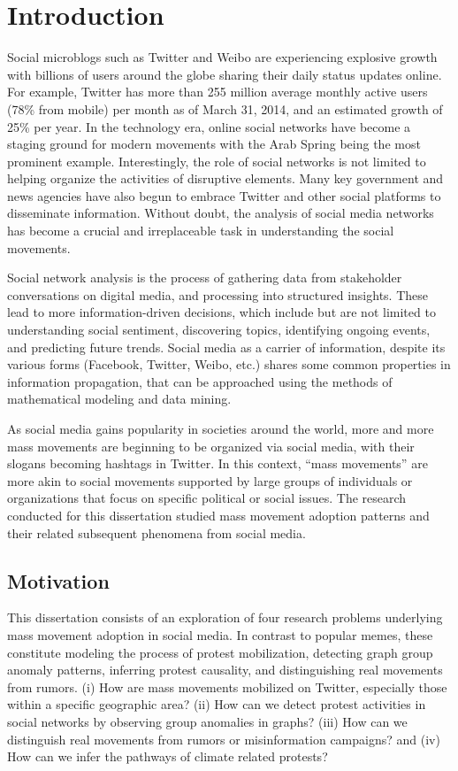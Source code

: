 \chapter{Introduction}
Social microblogs such as Twitter and Weibo are experiencing explosive growth with billions of users around the globe sharing their daily status updates online. For example, Twitter has more than 255 million average monthly active users (78\% from mobile) per month as of March 31, 2014, and an estimated growth of 25\% per year. In the technology era, online social networks have become a staging ground for modern movements with the Arab Spring being the most prominent example. Interestingly, the role of social networks is not limited to helping organize the activities of disruptive elements. Many key government and news agencies have also begun to embrace Twitter and other social platforms to disseminate information. Without doubt, the analysis of social media networks has become a crucial and irreplaceable task in understanding the social movements.

Social network analysis is the process of gathering data from stakeholder conversations on digital media, and processing into structured insights. These lead to more information-driven decisions, which include but are not limited to understanding social sentiment, discovering topics, identifying ongoing events, and predicting future trends. Social media as a carrier of information, despite its various forms (Facebook, Twitter, Weibo, etc.)
shares some common properties in information propagation, that can be approached
using the methods of mathematical modeling and data mining.

As social media gains popularity in societies around the world, more and more mass movements are beginning to be organized via social media, with their slogans becoming hashtags in Twitter. In this context, ``mass movements'' are more akin to social movements supported by large groups of individuals or organizations that focus on specific political or social issues. The research conducted for this dissertation studied mass movement adoption patterns and their related subsequent phenomena from social media.


\section{Motivation}
This dissertation consists of an exploration of four research problems underlying mass movement adoption in social media. In contrast to popular memes, these constitute modeling the process of protest mobilization, detecting graph group anomaly patterns, inferring protest causality, and distinguishing real movements from rumors. (i) How are mass movements mobilized on Twitter, especially those within a specific geographic area? (ii) How can we detect protest activities in social networks by observing group anomalies in graphs? (iii) How can we distinguish real movements from rumors or misinformation campaigns? and (iv) How can we infer the pathways of climate related protests?


